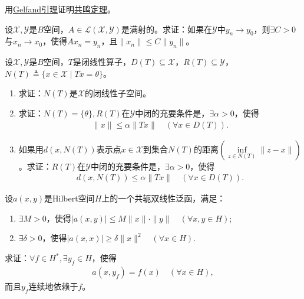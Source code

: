 \documentclass[../../main.tex]{subfiles}%
\begin{document}
\begin{example}
用\hyperref[lemma:泛函分析--Gelfand引理]{Gelfand引理}证明\hyperref[theorem:泛函分析--共鸣定理]{共鸣定理}。
\end{example}

\begin{example}
设$\mathscr{X},\mathscr{Y}$是$B$空间，$A\in\mathscr{L}(\mathscr{X},\mathscr{Y})$是满射的。求证：如果在$\mathscr{Y}$中$y_n\to y_0$，则$\exists C>0$与$x_n\to x_0$，使得$Ax_n=y_n$，且$\|x_n\|\leqslant C\|y_n\|$。
\end{example}

\begin{example}
设$\mathscr{X},\mathscr{Y}$是$B$空间，$T$是闭线性算子，$D(T)\subseteq\mathscr{X}$，$R(T)\subseteq\mathscr{Y}$，$N(T)\triangleq\{x\in\mathscr{X}\mid Tx=\theta\}$。
\begin{enumerate}[(1)]
\item 求证：$N(T)$是$\mathscr{X}$的闭线性子空间。
\item 求证：$N(T)=\{\theta\},R(T)$在$\mathscr{Y}$中闭的充要条件是，$\exists\alpha>0$，使得
\begin{align*}
\|x\|\leqslant\alpha\|Tx\|\quad (\forall x\in D(T)).
\end{align*}
\item 如果用$d(x,N(T))$表示点$x\in\mathscr{X}$到集合$N(T)$的距离$\left(\inf\limits_{z\in N(T)}\|z-x\|\right)$。求证：$R(T)$在$\mathscr{Y}$中闭的充要条件是，$\exists\alpha>0$，使得
\begin{align*}
d(x,N(T))\leqslant\alpha\|Tx\|\quad (\forall x\in D(T)).
\end{align*}
\end{enumerate}
\end{example}

\begin{example}
设$a(x,y)$是Hilbert空间$H$上的一个共轭双线性泛函，满足：
\begin{enumerate}[(1)]
\item $\exists M>0$，使得$|a(x,y)|\leqslant M\|x\|\cdot\|y\|\quad (\forall x,y\in H)$;
\item $\exists\delta>0$，使得$|a(x,x)|\geqslant\delta\|x\|^2\quad (\forall x\in H)$.
\end{enumerate}
求证：$\forall f\in H^*,\exists y_f\in H$，使得
\begin{align*}
a(x,y_f)=f(x)\quad (\forall x\in H),
\end{align*}
而且$y_f$连续地依赖于$f$。
\end{example}
\end{document}
